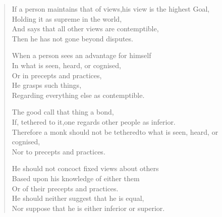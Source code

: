 
\begin{verse}

 If a person maintains that of views,\newline his view is the highest Goal,\\
Holding it as supreme in the world,\\
And says that all other views are contemptible,\\
Then he has not gone beyond disputes.


 When a person sees an advantage for himself\\
In what is seen, heard, or cognised,\\
Or in precepts and practices,\\
He grasps such things,\\
Regarding everything else as contemptible.


 The good call that thing a bond,\\
If, tethered to it,\newline one regards other people as inferior.\\
Therefore a monk should not be tethered\newline to what is seen, heard, or cognised,\\
Nor to precepts and practices.


 He should not concoct fixed views about others\\
Based upon his knowledge of either them\\
Or of their precepts and practices.\\
He should neither suggest that he is equal,\\
Nor suppose that he is either inferior or superior.


\end{verse}

